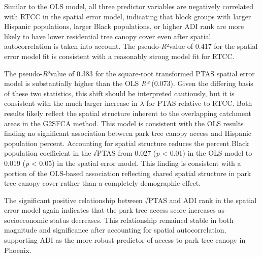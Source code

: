 \documentclass[
  sn-basic,
]{sn-jnl}
\begin{document}
Similar to the OLS model, all three predictor variables are negatively
correlated with RTCC in the spatial error model, indicating that block
groups with larger Hispanic populations, larger Black populations, or
higher ADI rank are more likely to have lower residential tree canopy
cover even after spatial autocorrelation is taken into account. The
pseudo-\emph{R}²value of 0.417 for the spatial error model fit is
consistent with a reasonably strong model fit for RTCC.

The pseudo-\emph{R}²value of 0.383 for the square-root transformed PTAS
spatial error model is substantially higher than the OLS \emph{R²}
(0.073). Given the differing basis of these two statistics, this shift
should be interpreted cautiously, but it is consistent with the much
larger increase in \(\lambda\) for PTAS relative to RTCC. Both results
likely reflect the spatial structure inherent to the overlapping
catchment areas in the G2SFCA method. This model is consistent with the
OLS results finding no significant association between park tree canopy
access and Hispanic population percent. Accounting for spatial structure
reduces the percent Black population coefficient in the √PTAS from 0.027
(\emph{p} \textless{} 0.01) in the OLS model to 0.019 (\emph{p}
\textless{} 0.05) in the spatial error model. This finding is consistent
with a portion of the OLS-based association reflecting shared spatial
structure in park tree canopy cover rather than a completely demographic
effect.

The significant positive relationship between √PTAS and ADI rank in the
spatial error model again indicates that the park tree access score
increases as socioeconomic status decreases. This relationship remained
stable in both magnitude and significance after accounting for spatial
autocorrelation, supporting ADI as the more robust predictor of access
to park tree canopy in Phoenix.
\end{document}
